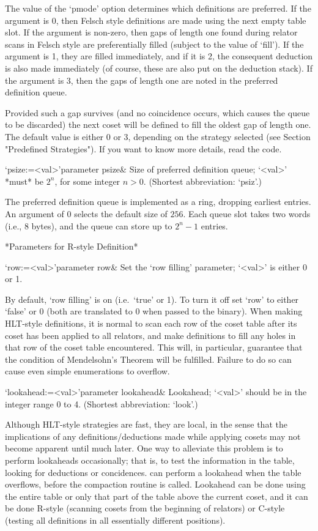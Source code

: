 The  value of  the  `pmode' option  determines  which definitions  are
preferred.  If  the argument is  0, then Felsch style  definitions are
made using  the next empty table  slot.  If the  argument is non-zero,
then gaps of length one found during relator scans in Felsch style are
preferentially  filled  (subject to  the  value  of  `fill').  If  the
argument  is 1,  they are  filled  immediately, and  if it  is 2,  the
consequent deduction  is also made  immediately (of course,  these are
also put on the deduction stack).  If the argument is 3, then the gaps
of length one are noted in the preferred definition queue.

Provided such a gap survives  (and no coincidence occurs, which causes
the queue to be discarded) the  next coset will be defined to fill the
oldest  gap of  length  one.  The  default  value is  either  0 or  3,
depending   on  the   strategy  selected   (see   Section  "Predefined
Strategies").  If you want to know more details, read the code.


\>`psize:=<val>'{parameter psize}&
Size of preferred definition queue; `<val>' *must*  be $2^n$, for some
integer $n>0$. (Shortest abbreviation: `psiz'.)

The  preferred definition  queue is  implemented as  a  ring, dropping
earliest entries. An argument of 0 selects  the default size of $256$.
Each  queue slot takes two words (i.e., 8 bytes),  and the  queue  can
store up to $2^n-1$ entries.

*Parameters for R-style Definition*

\>`row:=<val>'{parameter row}&
Set the \lq row filling' parameter; `<val>' is either 0 or 1.

By default, \lq row filling' is on (i.e.~`true' or 1).  To turn it off
set `row' to either `false' or 0 (both are translated to 0 when passed
to the {\ACE} binary).
When making  HLT-style definitions, it is  normal to scan  each row of
the coset table after its coset  has been applied to all relators, and
make definitions  to fill  any holes  in that row  of the  coset table
encountered. This will, in particular, guarantee that the condition of
Mendelsohn's Theorem  will be fulfilled.   Failure to do so  can cause
even simple enumerations to overflow.

\>`lookahead:=<val>'{parameter lookahead}&
Lookahead; `<val>' should be in the integer range 0 to 4.
(Shortest abbreviation: `look'.)
  
Although HLT-style strategies  are fast, they are local,  in the sense
that  the  implications   of  any  definitions/deductions  made  while
applying cosets may not become  apparent until much later.  One way to
alleviate this problem is to perform lookaheads occasionally; that is,
to  test the  information  in  the table,  looking  for deductions  or
concidences.  {\ACE} can perform a lookahead when the table overflows,
before the compaction routine is  called.  Lookahead can be done using
the entire  table or  only that  part of the  table above  the current
coset, and it can be  done R-style (scanning cosets from the beginning
of relators)  or C-style (testing  all definitions in  all essentially
different positions).

